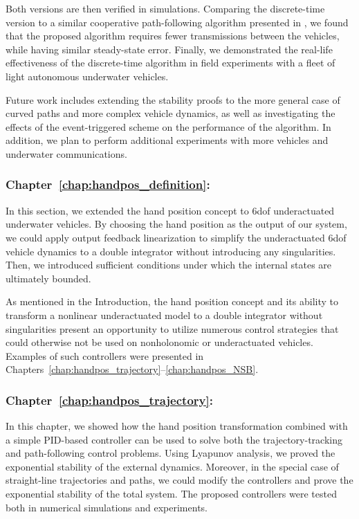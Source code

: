Both versions are then verified in simulations.
Comparing the discrete-time version to a similar cooperative path-following algorithm presented in \cite{praveen_cooperative_2018}, we found 
that the proposed algorithm requires fewer transmissions between the vehicles, while having similar steady-state error.
Finally, we demonstrated the real-life effectiveness of the discrete-time algorithm in field experiments with a fleet of light autonomous underwater vehicles.

Future work includes extending the stability proofs to the more general case of curved paths and more complex vehicle dynamics, as well as investigating the effects of the event-triggered scheme on the performance of the algorithm.
In addition, we plan to perform additional experiments with more vehicles and underwater communications.

\subsubsection{Chapter~\ref{chap:handpos_definition}: }

In this section, we extended the hand position concept to 6\gls{dof} underactuated underwater vehicles.
By choosing the hand position as the output of our system, we could apply output feedback linearization to simplify the underactuated 6\gls{dof} vehicle dynamics to a double integrator without introducing any singularities.
Then, we introduced sufficient conditions under which the internal states are ultimately bounded.

As mentioned in the Introduction, the hand position concept and its ability to transform a nonlinear underactuated model to a double integrator without singularities present an opportunity to utilize numerous control strategies that could otherwise not be used on nonholonomic or underactuated vehicles.
Examples of such controllers were presented in Chapters~\ref{chap:handpos_trajectory}--\ref{chap:handpos_NSB}.

\subsubsection{Chapter~\ref{chap:handpos_trajectory}: }

In this chapter, we showed how the hand position transformation combined with a simple PID-based controller can be used to solve both the trajectory-tracking and path-following control problems.
Using Lyapunov analysis, we proved the exponential stability of the external dynamics.
Moreover, in the special case of straight-line trajectories and paths, we could modify the controllers and prove the exponential stability of the total system.
The proposed controllers were tested both in numerical simulations and experiments.

